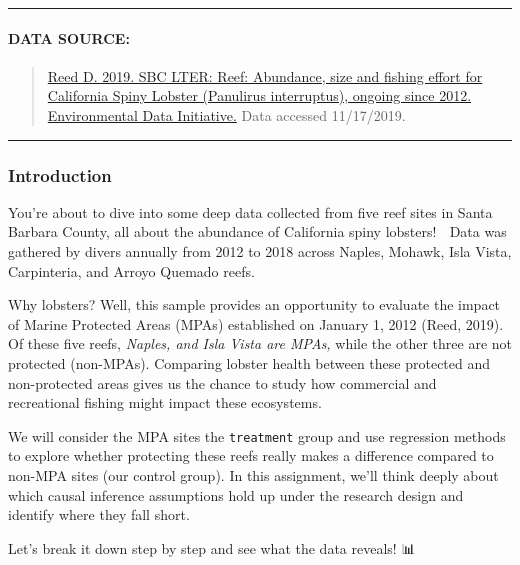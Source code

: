 \documentclass[
]{article}
\begin{document}
\begin{center}\rule{0.5\linewidth}{0.5pt}\end{center}

\paragraph{DATA SOURCE:}\label{data-source}

\begin{quote}
\href{https://doi.org/10.6073/pasta/a593a675d644fdefb736750b291579a0}{Reed
D. 2019. SBC LTER: Reef: Abundance, size and fishing effort for
California Spiny Lobster (Panulirus interruptus), ongoing since 2012.
Environmental Data Initiative.} Data accessed 11/17/2019.
\end{quote}

\begin{center}\rule{0.5\linewidth}{0.5pt}\end{center}

\subsubsection{\texorpdfstring{\textbf{Introduction}}{Introduction}}\label{introduction}

You're about to dive into some deep data collected from five reef sites
in Santa Barbara County, all about the abundance of California spiny
lobsters! 🦞 Data was gathered by divers annually from 2012 to 2018
across Naples, Mohawk, Isla Vista, Carpinteria, and Arroyo Quemado
reefs.

Why lobsters? Well, this sample provides an opportunity to evaluate the
impact of Marine Protected Areas (MPAs) established on January 1, 2012
(Reed, 2019). Of these five reefs, \emph{Naples, and Isla Vista are
MPAs,} while the other three are not protected (non-MPAs). Comparing
lobster health between these protected and non-protected areas gives us
the chance to study how commercial and recreational fishing might impact
these ecosystems.

We will consider the MPA sites the \texttt{treatment} group and use
regression methods to explore whether protecting these reefs really
makes a difference compared to non-MPA sites (our control group). In
this assignment, we'll think deeply about which causal inference
assumptions hold up under the research design and identify where they
fall short.

Let's break it down step by step and see what the data reveals! 📊
\end{document}
